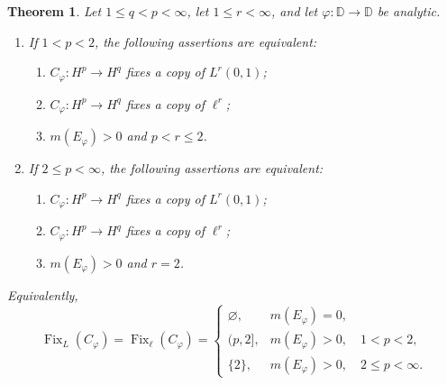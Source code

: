 \documentclass[11pt, reqno]{amsart}
\newtheorem{theorem}{Theorem}[section]
\theoremstyle{definition}
\theoremstyle{remark}
\newcommand{\D}{\mathbb{D}}
\begin{document}
\begin{theorem}
\label{thm:q-lt-p-class}
Let \(1\le q<p<\infty\), let \(1\le r<\infty\), and let
\(\varphi:\D\to\D\) be analytic.

\begin{enumerate}[label=\textup{(\roman*)}]
\item If \(1<p<2\), the following assertions are equivalent:
\begin{enumerate}[label=\textup{(\alph*)}]
\item \(C_\varphi:H^p\to H^q\) fixes a copy of \(L^r(0,1)\);
\item \(C_\varphi:H^p\to H^q\) fixes a copy of \(\ell^r\);
\item \(m(E_\varphi)>0\) and \(p<r\le2\).
\end{enumerate}

\item If \(2\le p<\infty\), the following assertions are equivalent:
\begin{enumerate}[label=\textup{(\alph*)}]
\item \(C_\varphi:H^p\to H^q\) fixes a copy of \(L^r(0,1)\);
\item \(C_\varphi:H^p\to H^q\) fixes a copy of \(\ell^r\);
\item \(m(E_\varphi)>0\) and \(r=2\).
\end{enumerate}
\end{enumerate}

Equivalently,
\[
        \operatorname{Fix}_{L}(C_\varphi)
        =
        \operatorname{Fix}_{\ell}(C_\varphi)
        =
        \begin{cases}
        \varnothing,
                & m(E_\varphi)=0,\\[1mm]
        (p,2],
                & m(E_\varphi)>0,\quad 1<p<2,\\[1mm]
        \{2\},
                & m(E_\varphi)>0,\quad 2\le p<\infty.
        \end{cases}
\]
\end{theorem}
\end{document}
